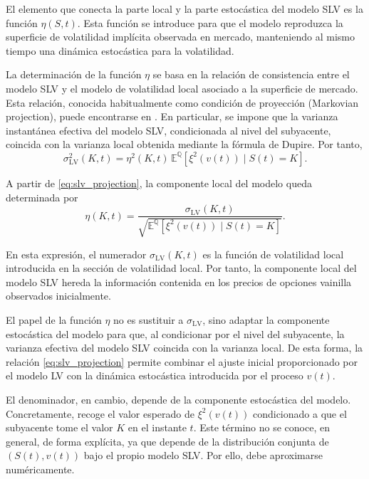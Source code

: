 El elemento que conecta la parte local y la parte estocástica del modelo SLV es la función \(\eta(S,t)\). Esta función se introduce para que el modelo reproduzca la superficie de volatilidad implícita observada en mercado, manteniendo al mismo tiempo una dinámica estocástica para la volatilidad.\medskip

La determinación de la función \(\eta\) se basa en la relación de consistencia entre el modelo SLV y el modelo de volatilidad local asociado a la superficie de mercado. Esta relación, conocida habitualmente como condición de proyección (Markovian projection), puede encontrarse en \cite[Sec.~10.2.1]{oosterlee2021modelos}. En particular, se impone que la varianza instantánea efectiva del modelo SLV, condicionada al nivel del subyacente, coincida con la varianza local obtenida mediante la fórmula de Dupire. Por tanto,
\begin{equation}
\label{eq:slv_projection}
\sigma_{\mathrm{LV}}^2(K,t)
=
\eta^2(K,t)\,
\mathbb{E}^{\mathbb{Q}}
\left[
\xi^2(v(t))\mid S(t)=K
\right].
\end{equation}

A partir de \ref{eq:slv_projection}, la componente local del modelo queda determinada por
\begin{equation}
\label{eq:eta_slv_general}
\eta(K,t)
=
\frac{
\sigma_{\mathrm{LV}}(K,t)
}{
\sqrt{
\mathbb{E}^{\mathbb{Q}}
\left[
\xi^2(v(t))\mid S(t)=K
\right]
}
}.
\end{equation}

En esta expresión, el numerador \(\sigma_{\mathrm{LV}}(K,t)\) es la función de volatilidad local introducida en la sección de volatilidad local. Por tanto, la componente local del modelo SLV hereda la información contenida en los precios de opciones vainilla observados inicialmente. \medskip

El papel de la función \(\eta\) no es sustituir a \(\sigma_{\mathrm{LV}}\), sino adaptar la componente estocástica del modelo para que, al condicionar por el nivel del subyacente, la varianza efectiva del modelo SLV coincida con la varianza local. De esta forma, la relación \ref{eq:slv_projection} permite combinar el ajuste inicial proporcionado por el modelo LV con la dinámica estocástica introducida por el proceso \(v(t)\).

El denominador, en cambio, depende de la componente estocástica del modelo. Concretamente, recoge el valor esperado de \(\xi^2(v(t))\) condicionado a que el subyacente tome el valor \(K\) en el instante \(t\). Este término no se conoce, en general, de forma explícita, ya que depende de la distribución conjunta de \((S(t),v(t))\) bajo el propio modelo SLV. Por ello, debe aproximarse numéricamente.

